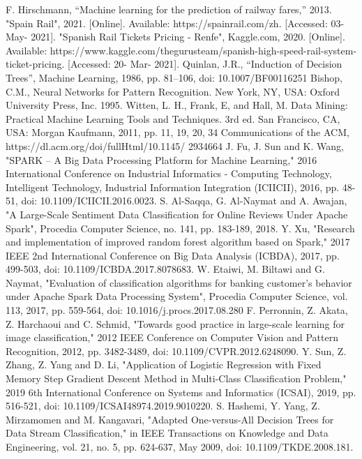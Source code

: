 \documentclass[conference]{IEEEtran}
\begin{document}
\begin{thebibliography}{00}
 F. Hirschmann, “Machine learning for the prediction of railway fares,” 2013.
 "Spain Rail", 2021. [Online]. Available: https://spainrail.com/zh. [Accessed: 03- May- 2021].
 "Spanish Rail Tickets Pricing - Renfe", Kaggle.com, 2020. [Online]. Available: https://www.kaggle.com/thegurusteam/spanish-high-speed-rail-system-ticket-pricing. [Accessed: 20- Mar- 2021].
 Quinlan, J.R., “Induction of Decision Trees”, Machine Learning, 1986, pp. 81–106, doi: 10.1007/BF00116251
 Bishop, C.M., Neural Networks for Pattern Recognition. New York, NY, USA: Oxford University Press, Inc. 1995.
 Witten, L. H., Frank, E, and Hall, M. Data Mining: Practical Machine Learning Tools and Techniques. 3rd ed. San Francisco, CA, USA: Morgan Kaufmann, 2011, pp. 11, 19, 20, 34
 Communications of the ACM, https://dl.acm.org/doi/fullHtml/10.1145/ 2934664
 J. Fu, J. Sun and K. Wang, "SPARK – A Big Data Processing Platform for Machine Learning," 2016 International Conference on Industrial Informatics - Computing Technology, Intelligent Technology, Industrial Information Integration (ICIICII), 2016, pp. 48-51, doi: 10.1109/ICIICII.2016.0023.
 S. Al-Saqqa, G. Al-Naymat and A. Awajan, "A Large-Scale Sentiment Data Classification for Online Reviews Under Apache Spark", Procedia Computer Science, no. 141, pp. 183-189, 2018.
 Y. Xu, "Research and implementation of improved random forest algorithm based on Spark," 2017 IEEE 2nd International Conference on Big Data Analysis (ICBDA), 2017, pp. 499-503, doi: 10.1109/ICBDA.2017.8078683.
 W. Etaiwi, M. Biltawi and G. Naymat, "Evaluation of classification algorithms for banking customer’s behavior under Apache Spark Data Processing System", Procedia Computer Science, vol. 113, 2017, pp. 559-564, doi: 10.1016/j.procs.2017.08.280
 F. Perronnin, Z. Akata, Z. Harchaoui and C. Schmid, "Towards good practice in large-scale learning for image classification," 2012 IEEE Conference on Computer Vision and Pattern Recognition, 2012, pp. 3482-3489, doi: 10.1109/CVPR.2012.6248090.
 Y. Sun, Z. Zhang, Z. Yang and D. Li, "Application of Logistic Regression with Fixed Memory Step Gradient Descent Method in Multi-Class Classification Problem," 2019 6th International Conference on Systems and Informatics (ICSAI), 2019, pp. 516-521, doi: 10.1109/ICSAI48974.2019.9010220.
 S. Hashemi, Y. Yang, Z. Mirzamomen and M. Kangavari, "Adapted One-versus-All Decision Trees for Data Stream Classification," in IEEE Transactions on Knowledge and Data Engineering, vol. 21, no. 5, pp. 624-637, May 2009, doi: 10.1109/TKDE.2008.181.

\end{thebibliography}
\end{document}
